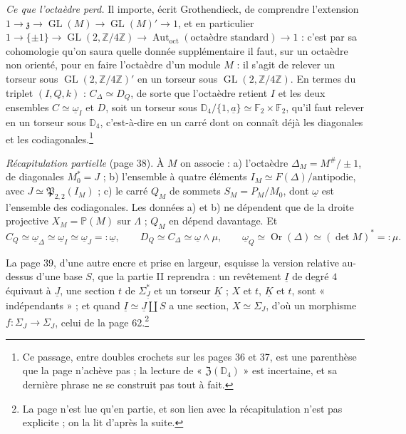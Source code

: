 \documentclass[11pt,a4paper]{article}
\begin{document}
\emph{Ce que l'octaèdre perd.} Il importe, écrit Grothendieck, de comprendre
l'extension $1 \to \mathfrak{z} \to \operatorname{GL}(M) \to \operatorname{GL}(M)'
\to 1$, et en particulier $1 \to \{\pm 1\} \to \operatorname{GL}(2,
\mathbb{Z}/4\mathbb{Z}) \to \operatorname{Aut}_{\mathrm{oct}}(\text{octaèdre
standard}) \to 1$ : c'est par sa cohomologie qu'on saura quelle donnée
supplémentaire il faut, sur un octaèdre non orienté, pour en faire l'octaèdre
d'un module $M$ : il s'agit de relever un torseur sous $\operatorname{GL}(2,
\mathbb{Z}/4\mathbb{Z})'$ en un torseur sous $\operatorname{GL}(2,
\mathbb{Z}/4\mathbb{Z})$. En termes du triplet $(I, Q, k)$ : $C_\Delta \simeq
D_Q$, de sorte que l'octaèdre retient $I$ et les deux ensembles $C \simeq
\underline{\omega}_I$ et $D$, soit un torseur sous $\mathbb{D}_4 /
\{1, \underline{a}\} \simeq \mathbb{F}_2 \times \mathbb{F}_2$, qu'il faut relever
en un torseur sous $\mathbb{D}_4$, c'est-à-dire en un carré dont on connaît déjà les
diagonales et les codiagonales.\footnote{Ce passage, entre doubles crochets sur
les pages 36 et 37, est une parenthèse que la page n'achève pas ; la lecture de
« $\mathfrak{Z}(\mathbb{D}_4)$ » est incertaine, et sa dernière phrase ne se
construit pas tout à fait.}

\emph{Récapitulation partielle} (page 38). À $M$ on associe : a) l'octaèdre
$\Delta_M = M^{\#}/\pm 1$, de diagonales $M_0^{*} = J$ ; b) l'ensemble à quatre
éléments $I_M \simeq F(\Delta)/\text{antipodie}$, avec $J \simeq
\mathfrak{P}_{2,2}(I_M)$ ; c) le carré $Q_M$ de sommets $S_M = P_M / M_0$, dont
$\underline{\omega}$ est l'ensemble des codiagonales. Les données a) et b) ne
dépendent que de la droite projective $X_M = \mathbb{P}(M)$ sur $\Lambda$ ;
$Q_M$ en dépend davantage. Et
\[
C_Q \simeq \underline{\omega}_\Delta \simeq \underline{\omega}_I \simeq
\underline{\omega}_J =: \underline{\omega}, \qquad D_Q \simeq C_\Delta \simeq
\underline{\omega} \wedge \mu, \qquad \underline{\omega}_Q \simeq
\operatorname{Or}(\Delta) \simeq (\det M)^{*} =: \mu .
\]

La page 39, d'une autre encre et prise en largeur, esquisse la version
relative au-dessus d'une base $S$, que la partie II reprendra : un revêtement
$\underline{I}$ de degré $4$ équivaut à $\underline{J}$, une section $t$ de
$\Sigma_{\underline{J}}^{*}$ et un torseur $\underline{K}$ ; $X$ et $t$,
$\underline{K}$ et $t$, sont « indépendants » ; et quand $\underline{I} \simeq
\underline{J} \amalg S$ a une section, $X \simeq \Sigma_J$, d'où un morphisme
$f : \Sigma_J \to \Sigma_J$, celui de la page 62.\footnote{La page n'est lue
qu'en partie, et son lien avec la récapitulation n'est pas explicite ; on la lit
d'après la suite.}
\end{document}
